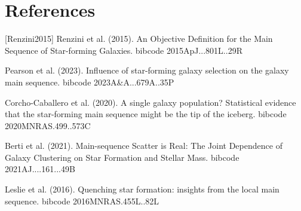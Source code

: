 \documentclass[twocolumn]{aastex631}
\begin{document}
\section*{References}
\footnotesize
[Renzini2015] Renzini et al. (2015). An Objective Definition for the Main Sequence of Star-forming Galaxies. bibcode 2015ApJ...801L..29R \par [Pearson2023] Pearson et al. (2023). Influence of star-forming galaxy selection on the galaxy main sequence. bibcode 2023A\&A...679A..35P \par [CorchoCaballero2020] Corcho-Caballero et al. (2020). A single galaxy population? Statistical evidence that the star-forming main sequence might be the tip of the iceberg. bibcode 2020MNRAS.499..573C \par [Berti2021] Berti et al. (2021). Main-sequence Scatter is Real: The Joint Dependence of Galaxy Clustering on Star Formation and Stellar Mass. bibcode 2021AJ....161...49B \par [Leslie2016] Leslie et al. (2016). Quenching star formation: insights from the local main sequence. bibcode 2016MNRAS.455L..82L
\end{document}
